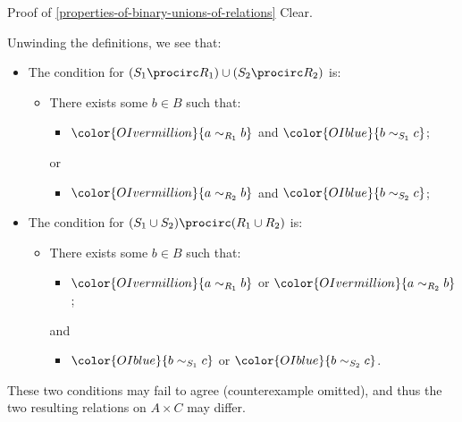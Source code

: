 \begin{Proof}{Proof of \cref{properties-of-binary-unions-of-relations}}%
    Clear.

    Unwinding the definitions, we see that:
    \begin{itemize}
        \item The condition for $(S_{1}\procirc R_{1})\cup(S_{2}\procirc R_{2})$ is:
            \begin{itemize}
                \item There exists some $b\in B$ such that:
                    \begin{itemize}
                        \item $\color{OIvermillion}{a\sim_{R_{1}}b}$ and $\color{OIblue}{b\sim_{S_{1}}c}$;
                    \end{itemize}
                    or
                    \begin{itemize}\setcounter{enumi}{2}
                        \item $\color{OIvermillion}{a\sim_{R_{2}}b}$ and $\color{OIblue}{b\sim_{S_{2}}c}$;
                    \end{itemize}
            \end{itemize}
        \item The condition for $(S_{1}\cup S_{2})\procirc(R_{1}\cup R_{2})$ is:
            \begin{itemize}
                \item There exists some $b\in B$ such that:
                    \begin{itemize}
                        \item $\color{OIvermillion}{a\sim_{R_{1}}b}$ or $\color{OIvermillion}{a\sim_{R_{2}}b}$;
                    \end{itemize}
                    and
                    \begin{itemize}\setcounter{enumi}{2}
                        \item $\color{OIblue}{b\sim_{S_{1}}c}$ or $\color{OIblue}{b\sim_{S_{2}}c}$.
                    \end{itemize}
            \end{itemize}
    \end{itemize}
    These two conditions may fail to agree (counterexample omitted), and thus the two resulting relations on $A\times C$ may differ.
\end{Proof}
